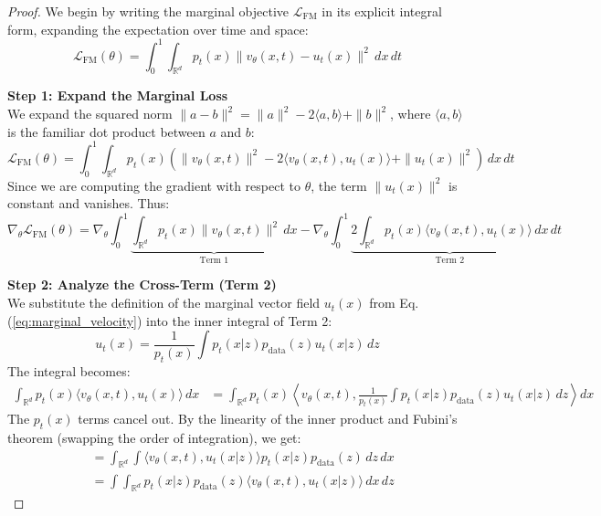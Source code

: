 \documentclass{book}
\begin{document}
\begin{proof}
We begin by writing the marginal objective $\mathcal{L}_{\text{FM}}$ in its explicit integral form, expanding the expectation over time and space:
\begin{equation}
\mathcal{L}_{\text{FM}}(\theta) = \int_0^1 \int_{\mathbb{R}^d} p_t(x) \| v_\theta(x, t) - u_t(x) \|^2 \, dx \, dt
\end{equation}

\textbf{Step 1: Expand the Marginal Loss} \\
We expand the squared norm $\|a - b\|^2 = \|a\|^2 - 2\langle a, b \rangle + \|b\|^2$, where $\langle a, b \rangle$ is the familiar dot product between $a$ and $b$:
\begin{equation}
\mathcal{L}_{\text{FM}}(\theta) = \int_0^1 \int_{\mathbb{R}^d} p_t(x) \left( \| v_\theta(x, t) \|^2 - 2 \langle v_\theta(x, t), u_t(x) \rangle + \| u_t(x) \|^2 \right) \, dx \, dt
\end{equation}
Since we are computing the gradient with respect to $\theta$, the term $\| u_t(x) \|^2$ is constant and vanishes. Thus:
\begin{equation} \label{eq:grad_fm_start}
\nabla_\theta \mathcal{L}_{\text{FM}}(\theta) = \nabla_\theta \int_0^1 \underbrace{\int_{\mathbb{R}^d} p_t(x) \| v_\theta(x, t) \|^2 \, dx}_{\text{Term 1}} - \nabla_\theta \int_0^1 \underbrace{2 \int_{\mathbb{R}^d} p_t(x) \langle v_\theta(x, t), u_t(x) \rangle \, dx}_{\text{Term 2}} \, dt
\end{equation}

\textbf{Step 2: Analyze the Cross-Term (Term 2)} \\
We substitute the definition of the marginal vector field $u_t(x)$ from Eq. (\ref{eq:marginal_velocity}) into the inner integral of Term 2:
\begin{equation}
u_t(x) = \frac{1}{p_t(x)} \int p_t(x|z) p_{\text{data}}(z) u_t(x|z) \, dz
\end{equation}
The integral becomes:
\begin{align}
\int_{\mathbb{R}^d} p_t(x) \langle v_\theta(x, t), u_t(x) \rangle \, dx &= \int_{\mathbb{R}^d} p_t(x) \left\langle v_\theta(x, t), \frac{1}{p_t(x)} \int p_t(x|z) p_{\text{data}}(z) u_t(x|z) \, dz \right\rangle dx
\end{align}
The $p_t(x)$ terms cancel out. By the linearity of the inner product and Fubini's theorem (swapping the order of integration), we get:
\begin{align}
&= \int_{\mathbb{R}^d} \int \langle v_\theta(x, t), u_t(x|z) \rangle p_t(x|z) p_{\text{data}}(z) \, dz \, dx \\
&= \int \int_{\mathbb{R}^d} p_t(x|z) p_{\text{data}}(z) \langle v_\theta(x, t), u_t(x|z) \rangle \, dx \, dz \label{eq:fm_term2_final}
\end{align}


\end{proof}
\end{document}
